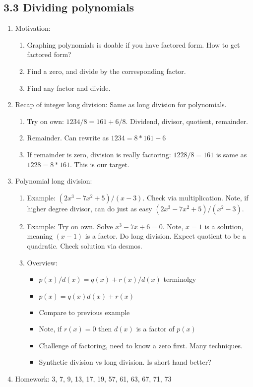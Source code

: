 \documentclass{article}
\begin{document}
\subsection{3.3 Dividing polynomials}

\begin{enumerate}
\item Motivation:
\begin{enumerate}
\item Graphing polynomials is doable if you have factored form. How to get factored form?
\item Find a zero, and divide by the corresponding factor. 
\item Find any factor and divide.
\end{enumerate}

\item Recap of integer long division: Same as long division for polynomials.
\begin{enumerate}
\item Try on own: $1234/8 = 161 + 6/8$. Dividend, divisor, quotient, remainder.
\item Remainder. Can rewrite as $1234 = 8*161 + 6$
\item If remainder is zero, division is really factoring: $1228/8 = 161$ is same as $1228 = 8*161$. This is our target.
\end{enumerate}

\item Polynomial long division:
\begin{enumerate}
\item Example: $(2x^3-7x^2+5)/(x-3)$. Check via multiplication. Note, if higher degree divisor, can do just as easy $(2x^3-7x^2+5)/(x^2-3)$.
\item Example: Try on own. Solve $x^3-7x+6=0$. Note, $x=1$ is a solution, meaning $(x-1)$ is a factor. Do long division. Expect quotient to be a quadratic. Check solution via desmos.
\item Overview:
\begin{itemize}
\item $p(x)/d(x) = q(x) + r(x)/d(x)$ terminolgy
\item $p(x) = q(x)d(x) + r(x)$
\item Compare to previous example
\item Note, if $r(x) = 0$ then $d(x)$ is a factor of $p(x)$
\item Challenge of factoring, need to know a zero first. Many techniques.
\item Synthetic division vs long division. Is short hand better?
\end{itemize} 
\end{enumerate}

\item Homework: 3, 7, 9, 13, 17, 19, 57, 61, 63, 67, 71, 73
\end{enumerate}
\end{document}
